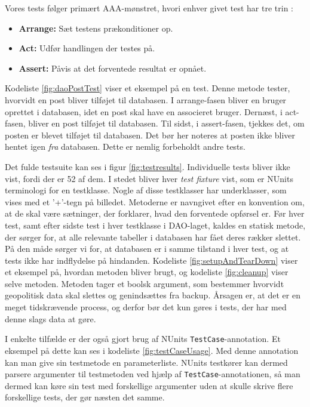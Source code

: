 Vores tests følger primært AAA-mønstret, hvori enhver givet test har tre trin \cite{ArrangeActAssert}:
\begin{itemize}
    \item \textbf{Arrange:} Sæt testens prækonditioner op.
    \item \textbf{Act:} Udfør handlingen der testes på.
    \item \textbf{Assert:} Påvis at det forventede resultat er opnået.
\end{itemize}
Kodeliste \ref{fig:daoPostTest} viser et eksempel på en test. Denne metode tester, hvorvidt en post bliver tilføjet til databasen. I arrange-fasen bliver en bruger oprettet i databasen, idet en post skal have en associeret bruger. Dernæst, i act-fasen, bliver en post tilføjet til databasen. Til sidst, i assert-fasen, tjekkes det, om posten er blevet tilføjet til databasen. Det bør her noteres at posten ikke bliver hentet igen \textit{fra} databasen. Dette er nemlig forbeholdt andre tests.

Det fulde testsuite kan ses i figur \ref{fig:testresults}. Individuelle tests bliver ikke vist, fordi der er 52 af dem. I stedet bliver hver \textit{test fixture} vist, som er NUnits terminologi for en testklasse. Nogle af disse testklasser har underklasser, som vises med et '+'-tegn på billedet. Metoderne er navngivet efter en konvention om, at de skal være sætninger, der forklarer, hvad den forventede opførsel er. Før hver test, samt efter sidste test i hver testklasse i DAO-laget, kaldes en statisk metode, der sørger for, at alle relevante tabeller i databasen har fået deres rækker slettet. På den måde sørger vi for, at databasen er i samme tilstand i hver test, og at tests ikke har indflydelse på hindanden. Kodeliste \ref{fig:setupAndTearDown} viser et eksempel på, hvordan metoden bliver brugt, og kodeliste \ref{fig:cleanup} viser selve metoden. Metoden tager et boolsk argument, som bestemmer hvorvidt geopolitisk data skal slettes og genindsættes fra backup. Årsagen er, at det er en meget tidskrævende process, og derfor bør det kun gøres i tests, der har med denne slags data at gøre.

I enkelte tilfælde er der også gjort brug af NUnits \texttt{TestCase}-annotation. Et eksempel på dette kan ses i kodeliste \ref{fig:testCaseUsage}. Med denne annotation kan man give sin testmetode en parameterliste. NUnits testkører kan dermed parsere argumenter til testmetoden ved hjælp af \texttt{TestCase}-annotationen, så man dermed kan køre sin test med forskellige argumenter uden at skulle skrive flere forskellige tests, der gør næsten det samme.

